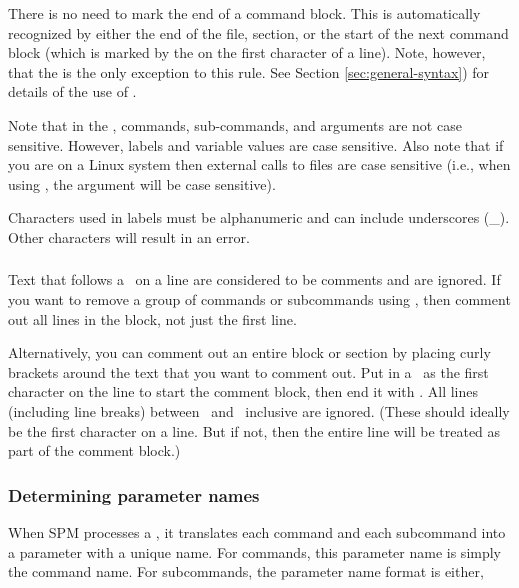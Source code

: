 There is no need to mark the end of a command block. This is automatically recognized by either the end of the file, section, or the start of the next command block (which is marked by the \command{} on the first character of a line). Note, however, that the  is the only exception to this rule. See Section \ref{sec:general-syntax}) for details of the use of . 

Note that in the \config, commands, sub-commands, and arguments are not case sensitive. However, labels and variable values are case sensitive. Also note that if you are on a Linux system then external calls to files are case sensitive (i.e., when using  , the argument  will be case sensitive). 

Characters used in labels must be alphanumeric and can include underscores (\_). Other characters will result in an error.

\subsubsection{}

Text that follows a \commentline\ on a line are considered to be comments and are ignored. If you want to remove a group of commands or subcommands using \commentline, then comment out all lines in the block, not just the first line. 

Alternatively, you can comment out an entire block or section by placing curly brackets around the text that you want to comment out. Put in a \commentstart\ as the first character on the line to start the comment block, then end it with \commentend. All lines (including line breaks) between \commentstart\ and \commentend\ inclusive are ignored. (These should ideally be the first character on a line. But if not, then the entire line will be treated as part of the comment block.)

\subsubsection{Determining parameter names\label{sec:parameter-names}}

When SPM processes a \config, it translates each command and each subcommand into a parameter with a unique name. For commands, this parameter name is simply the command name. For subcommands, the parameter name format is either, 

